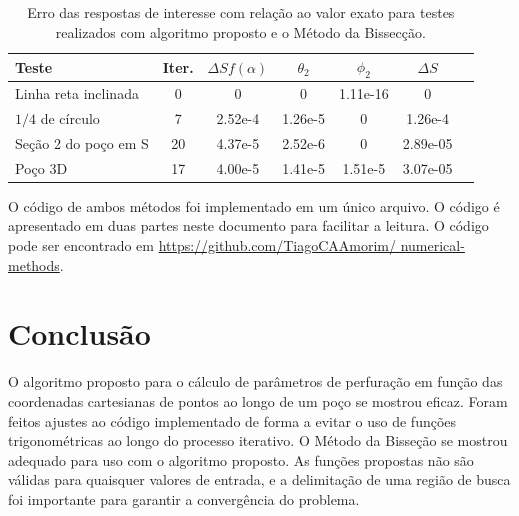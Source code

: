 \documentclass[final,5p]{elsarticle}
\numberwithin{equation}{section}
\begin{document}
    \begin{table} 
        \caption{Erro das respostas de interesse com relação ao valor exato para testes realizados com algoritmo proposto e o Método da Bissecção.}
        \begin{tabular}{ l c c c c c c }
            \hline
            Teste & Iter. & $\Delta S f(\alpha)$ & $\theta_2$ & $\phi_2$ & $\Delta S$ \\
            \hline
            Linha reta inclinada     & 0  & 0       & 0       & 1.11e-16 & 0  \\
            $1/4$ de círculo         & 7  & 2.52e-4 & 1.26e-5 & 0        & 1.26e-4 \\
            Seção 2 do poço em S & 20 & 4.37e-5 & 2.52e-6 & 0        & 2.89e-05 \\
            Poço 3D                  & 17 & 4.00e-5 & 1.41e-5 & 1.51e-5  & 3.07e-05 \\
            \hline
        \end{tabular}
        \label{table:resultados}
    \end{table}

    O código de ambos métodos foi implementado em um único arquivo. O código é apresentado em duas partes neste documento para facilitar a leitura. O código pode ser encontrado em \href{https://github.com/TiagoCAAmorim/numerical-methods/blob/main/01_Bissecao/01_bissection.c}{https://github.com/TiagoCAAmorim/ numerical-methods}.
    
    \section{Conclusão}
    
    O algoritmo proposto para o cálculo de parâmetros de perfuração em função das coordenadas cartesianas de pontos ao longo de um poço se mostrou eficaz. Foram feitos ajustes ao código implementado de forma a evitar o uso de funções trigonométricas ao longo do processo iterativo.
    O Método da Bisseção se mostrou adequado para uso com o algoritmo proposto. As funções propostas não são válidas para quaisquer valores de entrada, e a delimitação de uma região de busca foi importante para garantir a convergência do problema.


\end{document}
